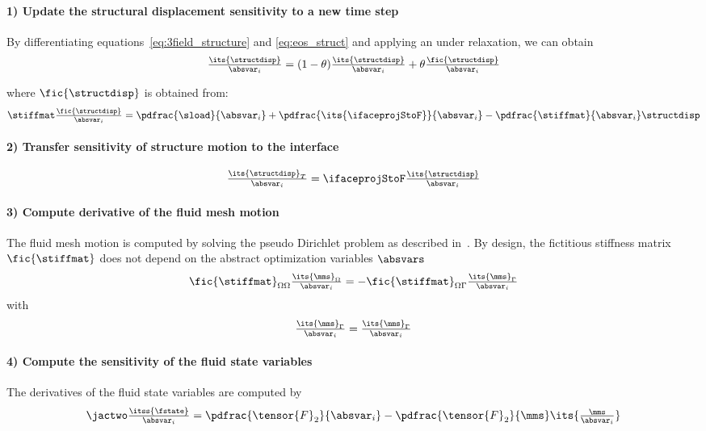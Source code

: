 \documentclass[../main.tex]{subfiles}
\begin{document}
\paragraph{1) Update the structural displacement sensitivity to a new time step}
By differentiating equations~\eqref{eq:3field_structure} and \eqref{eq:eos_struct} and applying an under relaxation, we can obtain
\begin{align}\label{eq:underrelax_structdisp}
\tfrac{\its{\structdisp}}{\absvar_i} =
(1-\theta)
\tfrac{\its{\structdisp}}{\absvar_i} +
\theta \tfrac{\fic{\structdisp}}{\absvar_i}
\end{align}

where $\fic{\structdisp}$ is obtained from:
\begin{align}\label{eq:fictious_structdisp}
\stiffmat \tfrac{\fic{\structdisp}}{\absvar_i} =
\pdfrac{\sload}{\absvar_i} + \pdfrac{\its{\ifaceprojStoF}}{\absvar_i} -
\pdfrac{\stiffmat}{\absvar_i} \structdisp
\end{align}


\paragraph{2) Transfer sensitivity of structure motion to the interface}
\begin{equation}\label{eq:interface_projections}
\tfrac{\its{\structdisp}_T}{\absvar_i} =
\ifaceprojStoF \tfrac{\its{\structdisp}}{\absvar_i}
\end{equation}


\paragraph{3) Compute derivative of the fluid mesh motion}
The fluid mesh motion is computed by solving the pseudo Dirichlet problem as described in~\cite{Farhat1995}. By design, the fictitious stiffness matrix $\fic{\stiffmat}$ does not depend on the abstract optimization variables $\absvars$
\begin{align}\label{eq:mms_domain}
\fic{\stiffmat}_{\Omega \Omega}  \tfrac{\its{\mms}_{\Omega}}{\absvar_i} =
-\fic{\stiffmat}_{\Omega \Gamma} \tfrac{\its{\mms}_{\Gamma}}{\absvar_i}
\end{align}
with
\begin{align}
\tfrac{\its{\mms}_{\Gamma}}{\absvar_i} =
\tfrac{\its{\mms}_{\Gamma}}{\absvar_i}
\end{align}


\paragraph{4) Compute the sensitivity of the fluid state variables}
The derivatives of the fluid state variables are computed by
\begin{align}
\jactwo \tfrac{\itss{\fstate}}{\absvar_i} =
\pdfrac{\tensor{F}_2}{\absvar_i} - \pdfrac{\tensor{F}_2}{\mms} \its{\tfrac{\mms}{\absvar_i}}
\end{align}
\end{document}

